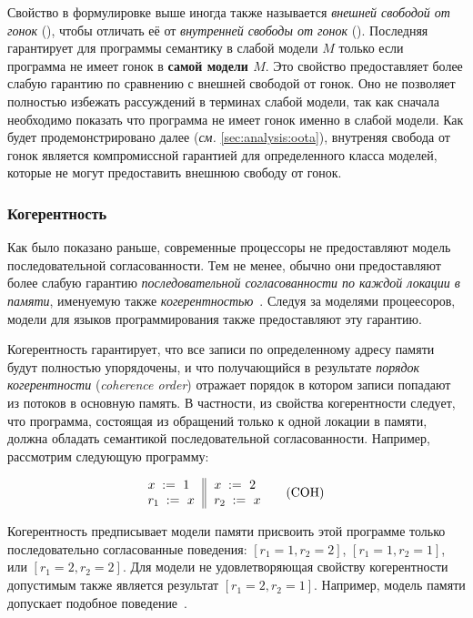 Свойство \DRF в формулировке выше иногда также называется
\emph{внешней свободой от гонок} (\eDRF), 
чтобы отличать её от \emph{внутренней свободы от гонок} (\iDRF).
Последняя гарантирует для программы семантику \SC
в слабой модели $M$ только если программа 
не имеет гонок в \textbf{самой модели $M$}.
Это свойство предоставляет более слабую гарантию
по сравнению с внешней свободой от гонок. 
Оно не позволяет полностью избежать рассуждений 
в терминах слабой модели, так как 
сначала необходимо показать что программа не имеет 
гонок именно в слабой модели. 
Как будет продемонстрировано далее (\emph{см.} \cref{sec:analysis:oota}), 
внутреняя свобода от гонок является компромиссной гарантией 
для определенного класса моделей, которые не могут 
предоставить внешнюю свободу от гонок. 

\subsubsection{Когерентность}
\label{sec:background:coh}

Как было показано раньше, современные процессоры
не предоставляют модель последовательной согласованности. 
Тем не менее, обычно они предоставляют более слабую 
гарантию \emph{последовательной согласованности 
по каждой локации в памяти}, именуемую также 
\emph{когерентностью}~\cite{Alglave-al:TOPLAS14}. 
Следуя за моделями процеесоров, модели 
для языков программирования также предоставляют эту гарантию.

Когерентность гарантирует, что все записи 
по определенному адресу памяти будут полностью упорядочены,
и что получающийся в результате \emph{порядок когерентности} 
(\emph{coherence order}) отражает порядок 
в котором записи попадают из потоков в основную память.
В частности, из свойства когерентности следует, 
что программа, состоящая из обращений только 
к одной локации в памяти, должна 
обладать семантикой последовательной согласованности.
Например, рассмотрим следующую программу:

\begin{equation*}
\inarrII{
   \writeInst{}{x}{1}   \\
   \readInst{}{r_1}{x}  \\
}{
   \writeInst{}{x}{2}   \\
   \readInst{}{r_2}{x}  \\
}
\tag{COH}\label{ex:coh}
\end{equation*}

Когерентность предписывает модели памяти 
присвоить этой программе только последовательно 
согласованные поведения:
${[r_1=1, r_2=2]}$, ${[r_1=1, r_2=1]}$, или ${[r_1=2, r_2=2]}$.
Для модели не удовлетворяющая свойству когерентности 
допустимым также является результат ${[r_1=2, r_2=1]}$.
Например, модель памяти \Java допускает подобное поведение~\cite{Manson-al:POPL05}.

